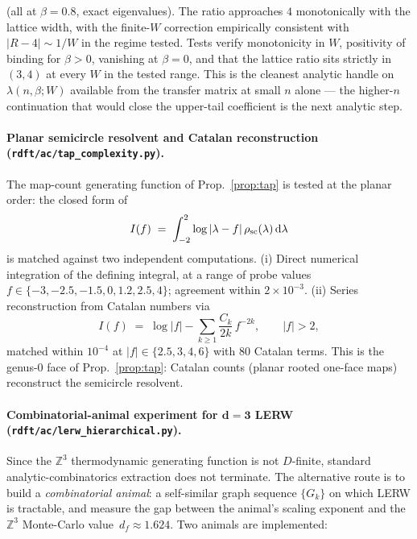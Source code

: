 \documentclass[10pt,a4paper,twocolumn]{article}
\theoremstyle{plain}
\theoremstyle{definition}
\newcommand{\dd}{\mathrm{d}}
\begin{document}
\medskip
\noindent (all at $\beta = 0.8$, exact eigenvalues).  The ratio
approaches $4$ monotonically with the lattice width, with the
finite-$W$ correction empirically consistent with $|R - 4| \sim 1/W$
in the regime tested.  Tests verify monotonicity in $W$,
positivity of binding for $\beta > 0$, vanishing at $\beta = 0$,
and that the lattice ratio sits strictly in $(3, 4)$ at every $W$
in the tested range.  This is the cleanest analytic handle on
$\lambda(n, \beta; W)$ available from the transfer matrix at
small $n$ alone --- the higher-$n$ continuation that would close
the upper-tail coefficient is the next analytic step.

\paragraph{Planar semicircle resolvent and Catalan reconstruction
(\texttt{rdft/ac/tap\_complexity.py}).}
The map-count generating function of Prop.~\ref{prop:tap} is tested
at the planar order: the closed form of
\begin{equation}
  I(f) \;=\; \int_{-2}^{2} \log|\lambda - f|\, \rho_{\rm sc}(\lambda)
  \,\dd\lambda
\end{equation}
is matched against two independent computations.  (i) Direct
numerical integration of the defining integral, at a range of probe
values $f \in \{-3, -2.5, -1.5, 0, 1.2, 2.5, 4\}$; agreement within
$2 \times 10^{-3}$.  (ii) Series reconstruction from Catalan numbers
via
\[
  I(f) \;=\; \log|f| - \sum_{k \geq 1} \frac{C_k}{2k}\, f^{-2k},
  \qquad |f| > 2,
\]
matched within $10^{-4}$ at $|f| \in \{2.5, 3, 4, 6\}$ with $80$
Catalan terms.  This is the genus-$0$ face of Prop.~\ref{prop:tap}:
Catalan counts (planar rooted one-face maps) reconstruct the
semicircle resolvent.

\paragraph{Combinatorial-animal experiment for $\boldsymbol{d=3}$
LERW (\texttt{rdft/ac/lerw\_hierarchical.py}).}
Since the $\mathbb{Z}^3$ thermodynamic generating function is not
$D$-finite, standard analytic-combinatorics extraction does not
terminate.  The alternative route is to build a \emph{combinatorial
animal}: a self-similar graph sequence $\{G_k\}$ on which LERW is
tractable, and measure the gap between the animal's scaling
exponent and the $\mathbb{Z}^3$ Monte-Carlo value~$d_f \approx
1.624$.  Two animals are implemented:
\end{document}
